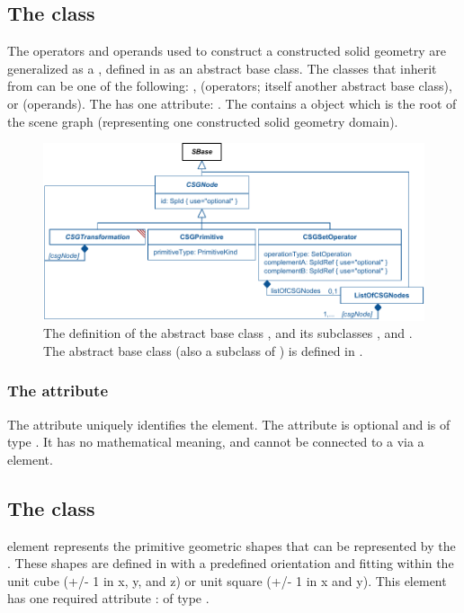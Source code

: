 \subsection{The  class}
\label{csgnode-class}
The operators and operands used to construct a constructed solid geometry are generalized as a \CSGNode, defined in  as an abstract base class. The classes that inherit from \CSGNode can be one of the following: \CSGSetOperator, \CSGTransformation (operators; itself another abstract base class), or \CSGPrimitive (operands). The \CSGNode has one attribute: . The \CSGObject contains a \CSGNode object which is the root of the \CSGObject scene graph (representing one constructed solid geometry domain).

\begin{figure}[ht]
  \includegraphics{figs/CSGNode-uml}
  \caption{The definition of the abstract base class \CSGNode, and its subclasses \CSGPrimitive, and \CSGSetOperator.  The abstract base class \CSGTransformation (also a subclass of \CSGNode) is defined in .}
  \label{CSGNode-uml}
  \label{CSGPrimitive-uml}
  \label{CSGSetOperator-uml}
  \label{ListOfCSGNodes-uml}
\end{figure}

\subsubsection{The \fixttspace{} attribute}
The  attribute uniquely identifies the \CSGNode element. The attribute is optional and is of type .  It has no mathematical meaning, and cannot be connected to a \Parameter via a \SpatialSymbolReference element.


\subsection{The  class}
\label{csgprimitive-class}
\CSGPrimitive element represents the primitive geometric shapes that can be represented by the \CSGeometry. These shapes are defined in  with a predefined orientation and fitting within the unit cube (+/- 1 in x, y, and z) or unit square (+/- 1 in x and y). This element has one required attribute :  of type .

